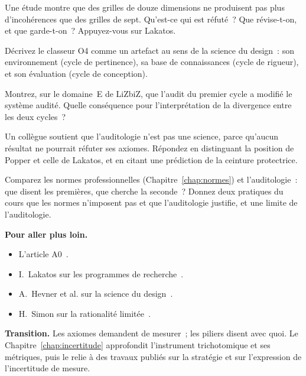\begin{boxexo}[title={\ding{45}\quad Exercice~30.6. Noyau dur et ceinture \niveaumoyen}]
Une étude montre que des grilles de douze dimensions ne produisent pas plus
d'incohérences que des grilles de sept. Qu'est-ce qui est réfuté~? Que
révise-t-on, et que garde-t-on~? Appuyez-vous sur Lakatos.
\end{boxexo}

\begin{boxexo}[title={\ding{45}\quad Exercice~30.7. Un artefact de science du design \niveaumoyen}]
Décrivez le classeur O4 comme un artefact au sens de la science du
design~: son environnement (cycle de pertinence), sa base de connaissances
(cycle de rigueur), et son évaluation (cycle de conception).
\end{boxexo}

\begin{boxexo}[title={\ding{45}\quad Exercice~30.8. La réflexivité \niveaumoyen}]
Montrez, sur le domaine~E de LiZbiZ, que l'audit du premier cycle a modifié
le système audité. Quelle conséquence pour l'interprétation de la
divergence entre les deux cycles~?
\end{boxexo}

\begin{boxexo}[title={\ding{45}\quad Exercice~30.9. Est-ce réfutable~? \niveauexpert}]
Un collègue soutient que l'auditologie n'est pas une science, parce
qu'aucun résultat ne pourrait réfuter ses axiomes. Répondez en distinguant
la position de Popper et celle de Lakatos, et en citant une prédiction
de la ceinture protectrice.
\end{boxexo}

\begin{boxexo}[title={\ding{45}\quad Exercice~30.10. Ce que l'auditologie ajoute \niveauexpert}]
Comparez les normes professionnelles (Chapitre~\ref{chap:normes}) et
l'auditologie~: que disent les premières, que cherche la seconde~?
Donnez deux pratiques du cours que les normes n'imposent pas et que
l'auditologie justifie, et une limite de l'auditologie.
\end{boxexo}

\bigskip

\begin{boxinfo}
\textbf{Pour aller plus loin.}
\begin{itemize}
    \item L'article A0~\cite{minka2026auditologie}.
    \item I.~Lakatos sur les programmes de recherche~\cite{lakatos1970}.
    \item A.~Hevner et al. sur la science du design~\cite{hevner2004design}.
    \item H.~Simon sur la rationalité limitée~\cite{simon1957}.
\end{itemize}
\end{boxinfo}

\begin{boxinfo}
\textbf{Transition.} Les axiomes demandent de mesurer~; les piliers disent
avec quoi. Le Chapitre~\ref{chap:incertitude} approfondit l'instrument
trichotomique et ses métriques, puis le relie à des travaux publiés sur la
stratégie et sur l'expression de l'incertitude de mesure.
\end{boxinfo}
